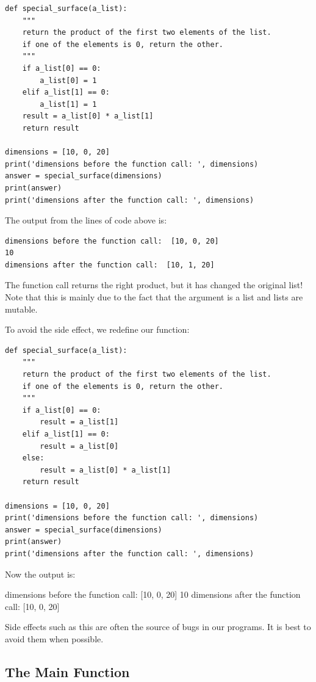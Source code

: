 \documentclass{article}
\begin{document}
\begin{lstlisting}
def special_surface(a_list):
    """
    return the product of the first two elements of the list.
    if one of the elements is 0, return the other.
    """
    if a_list[0] == 0:
        a_list[0] = 1       
    elif a_list[1] == 0:
        a_list[1] = 1
    result = a_list[0] * a_list[1]
    return result

dimensions = [10, 0, 20]
print('dimensions before the function call: ', dimensions)
answer = special_surface(dimensions)
print(answer)
print('dimensions after the function call: ', dimensions)
\end{lstlisting}

The output from the lines of code above is:

\begin{lstlisting}
dimensions before the function call:  [10, 0, 20]
10
dimensions after the function call:  [10, 1, 20]
\end{lstlisting}
 
The function call returns the right product, but it has changed the original list!
Note that this is mainly due to the fact that the argument is a list and lists are mutable.  

To avoid the side effect, we redefine our function:

\begin{lstlisting}
def special_surface(a_list):
    """
    return the product of the first two elements of the list.
    if one of the elements is 0, return the other.
    """
    if a_list[0] == 0:
        result = a_list[1]
    elif a_list[1] == 0:
        result = a_list[0]
    else:
        result = a_list[0] * a_list[1]
    return result
       
dimensions = [10, 0, 20]
print('dimensions before the function call: ', dimensions)
answer = special_surface(dimensions)
print(answer)
print('dimensions after the function call: ', dimensions) 
\end{lstlisting}

Now the output is:

dimensions before the function call:  [10, 0, 20]
10
dimensions after the function call:  [10, 0, 20]
 
Side effects such as this are often the source of bugs in our programs.  It is best to avoid them when possible.

\subsection{The Main Function}
\end{document}

